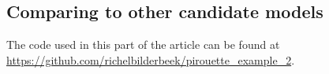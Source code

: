 





\subsection{Comparing to other candidate models}

The code used in this part of the article can be found at 
\url{https://github.com/richelbilderbeek/pirouette_example_2}. 

